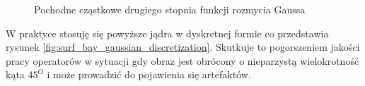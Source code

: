 \begin{figure}
\centering
{}
\caption{Pochodne cząstkowe drugiego stopnia funkcji rozmycia Gaussa}
\label{pict:surf_exact_kernel}
\end{figure}
W praktyce stosuję się powyższe jądra w dyskretnej formie co przedstawia rysunek \ref{fig:surf_bay_gaussian_discretization}. Skutkuje to pogorszeniem jakości pracy operatorów w sytuacji gdy obraz jest obrócony o nieparzystą wielokrotność kąta $45^O$ i może prowadzić do pojawienia się artefaktów. 


